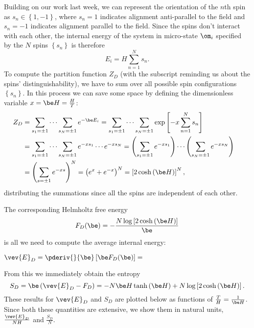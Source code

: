 Building on our work last week, we can represent the orientation of the $n$th spin as $s_n \in \left\{1, -1\right\}$, where $s_n = 1$ indicates alignment anti-parallel to the field and $s_n = -1$ indicates alignment parallel to the field.
Since the spins don't interact with each other, the internal energy of the system in micro-state $\om_i$ specified by the $N$ spins $\left\{s_n\right\}$ is therefore
\begin{equation}
  \label{eq:spin_energy}
  E_i = H \sum_{n = 1}^N s_n.
\end{equation}
To compute the partition function $Z_D$ (with the subscript reminding us about the spins' distinguishability), we have to sum over all possible spin configurations $\left\{s_n\right\}$.
In this process we can save some space by defining the dimensionless variable $x = \be H = \frac{H}{T}$:
\begin{align}
  Z_D & = \sum_{s_1 = \pm 1} \cdots \sum_{s_N = \pm 1} e^{-\be E_i} = \sum_{s_1 = \pm 1} \cdots \sum_{s_N = \pm 1} \exp\left[-x \sum_{n = 1}^N s_n\right] \cr
      & = \sum_{s_1 = \pm 1} \cdots \sum_{s_N = \pm 1} e^{-x s_1} \cdots e^{-x s_N} = \left(\sum_{s_1 = \pm 1} e^{-x s_1}\right) \cdots \left(\sum_{s_N = \pm 1} e^{-x s_N}\right) \cr
      & = \left(\sum_{s = \pm 1} e^{-x s}\right)^N = \left(e^x + e^{-x}\right)^N = \left[2\cosh\left(\be H\right)\right]^N, \label{eq:spin_part_func}
\end{align}
distributing the summations since all the spins are independent of each other.

The corresponding Helmholtz free energy
\begin{equation}
  \label{eq:dist_Helm}
  F_D(\be) = -\frac{N \log\left[2\cosh\left(\be H\right)\right]}{\be}
\end{equation}
is all we need to compute the average internal energy:
\begin{mdframed}
  $\displaystyle \vev{E}_D = \pderiv{}{\be}\left[\be F_D(\be)\right] = $ \\[100 pt]
\end{mdframed}
From this we immediately obtain the entropy
\begin{equation}
  \label{eq:dist_entropy}
  S_D = \be\left(\vev{E}_D - F_D\right) = -N\be H \tanh\left(\be H\right) + N \log\left[2\cosh\left(\be H\right)\right].
\end{equation}
These results for $\vev{E}_D$ and $S_D$ are plotted below as functions of $\frac{T}{H} = \frac{1}{\be H}$.
Since both these quantities are extensive, we show them in natural units, $\frac{\vev{E}_D}{NH}$ and $\frac{S_D}{N}$.

